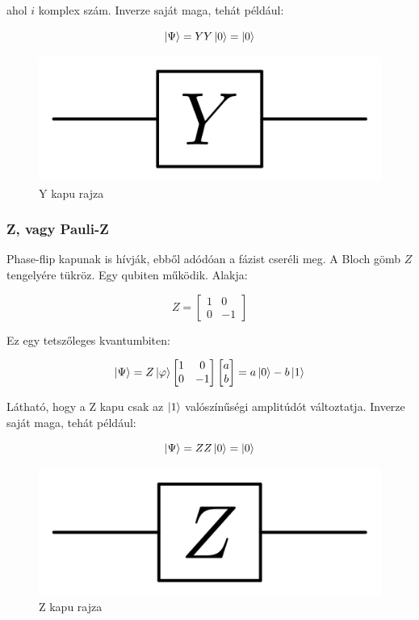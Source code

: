 \documentclass[
]{thesis-ekf}
\theoremstyle{definition}
\theoremstyle{remark}
\begin{document}
ahol $i$ komplex szám. Inverze saját maga, tehát például:

\begin{equation}
	\ket{\Psi}=YY\ket{0}=\ket{0}
\end{equation}

\begin{figure}[H]
	\centering
	\includegraphics[width=0.3\linewidth]{Pauli_Y}
	\caption{Y kapu rajza}
	\label{fig:pauliy}
\end{figure}


\subsubsection{Z, vagy Pauli-Z}
Phase-flip kapunak is hívják, ebből adódóan a fázist cseréli meg. A Bloch gömb $Z$ tengelyére tükröz. Egy qubiten működik. Alakja:

\begin{equation}
	Z= 
	\begin{bmatrix}
		1 & 0\\
		0 & -1
	\end{bmatrix}
\end{equation}

Ez egy tetszőleges kvantumbiten:

\begin{equation}
	\ket{\Psi}=Z\ket{\varphi}
		\begin{bmatrix}
			1 & 0\\
			0 & -1
		\end{bmatrix}
		\begin{bmatrix}
			a\\
			b
		\end{bmatrix}=a\ket{0}-b\ket{1}
\end{equation}

Látható, hogy a Z kapu csak az $\ket{1}$ valószínűségi amplitúdót változtatja. Inverze saját maga, tehát például:

\begin{equation}
	\ket{\Psi}=ZZ\ket{0}=\ket{0}
\end{equation}

\begin{figure}[H]
	\centering
	\includegraphics[width=0.3\linewidth]{Pauli_Z}
	\caption{Z kapu rajza}
	\label{fig:pauliz}
\end{figure}
\end{document}
